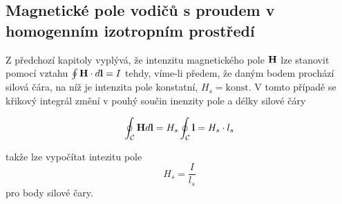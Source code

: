     \subsection{Magnetické pole vodičů s proudem v homogen\-ním izo\-trop\-ním prostředí}
      Z předchozí kapitoly vyplývá, že intenzitu magnetického pole $\mathbf{H}$ lze stanovit pomocí
      vztahu $\oint\mathbf{H}\cdot d\mathbf{l} = I$ tehdy, víme-li předem, že daným bodem prochází silová
      čára, na níž je intenzita pole konstatní, $H_s = \text{konst}$. V tomto případě se křikový
      integrál změní v pouhý součin inenzity pole a délky silové čáry
       
       \begin{equation}\label{TEMP:eq_1MR_v_hom_p}
         \oint_\mathcal{C}\mathbf{H}d\mathbf{l} = H_s\oint_\mathcal{C}\mathbf{l} = H_s\cdot l_s
       \end{equation}      
       
      takže lze vypočítat intezitu pole $$H_s = \frac{I}{l_s}$$ pro body silové čary. 
      
